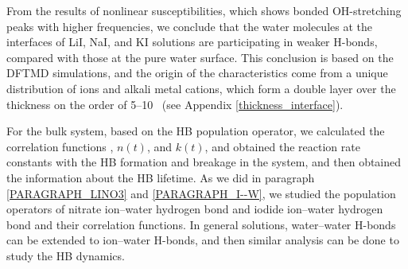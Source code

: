 From the results of nonlinear susceptibilities, which shows bonded OH-stretching peaks with higher frequencies, 
we conclude that the water molecules at the interfaces of LiI, NaI, and KI solutions are participating 
in weaker H-bonds, compared with those at the pure water surface. 
This conclusion is based on the DFTMD simulations, and %
the origin of the characteristics come from a unique distribution of \I ions and alkali metal cations, 
which form a double layer \cite{Shultz2010} over the thickness on the order of 5--10 \A\ (see Appendix \ref{thickness_interface}).

For the bulk system, based on the HB population operator, 
we calculated the correlation functions \CHB, $n(t)$, and $k(t)$, and obtained the reaction rate constants with the HB formation and breakage in the system, 
and then obtained the information about the HB lifetime. 
As we did in paragraph \ref{PARAGRAPH_LINO3} and \ref{PARAGRAPH_I--W}, we studied the population operators of nitrate ion--water hydrogen bond 
and iodide ion--water hydrogen bond and their correlation functions. In general solutions, water--water H-bonds can be extended to ion--water H-bonds, 
and then similar analysis can be done to study the HB dynamics.

